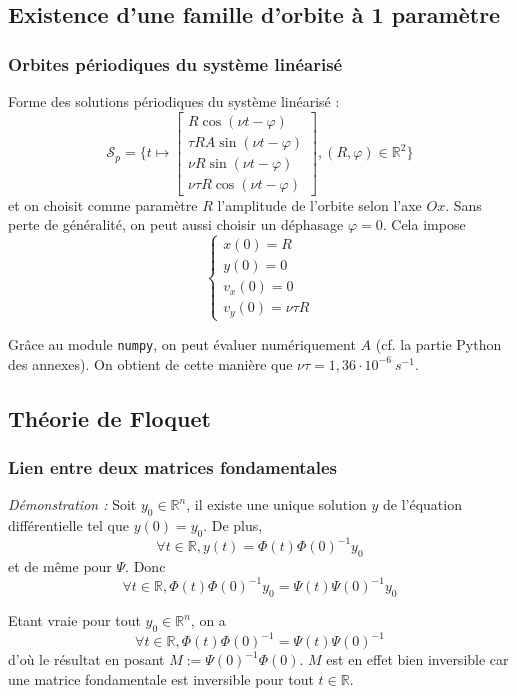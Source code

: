 \documentclass{beamer}
\begin{document}
	\subsection{Existence d'une famille d'orbite à 1 paramètre}
	\begin{frame}[fragile]
		\frametitle{Orbites périodiques du système linéarisé}{\small
		Forme des solutions périodiques du système linéarisé :
		\begin{equation*}
			\mathcal{S}_p = \{ t \mapsto
			\begin{bmatrix}
			R\cos(\nu t - \varphi) \\ \tau RA\sin(\nu t - \varphi) \\ \nu R \sin(\nu t - \varphi) \\ \nu\tau R \cos(\nu t - \varphi)
			\end{bmatrix}, (R,\varphi) \in \mathbb{R}^2
			\}
		\end{equation*}
		et on choisit comme paramètre $R$ l'amplitude de l'orbite selon l'axe $Ox$. Sans perte de généralité, on peut aussi choisir un déphasage $\varphi = 0$. Cela impose
		\begin{equation*}
			\begin{cases}
				x(0) = R \\ y(0) = 0 \\ v_x(0) = 0 \\ v_y(0) = \nu\tau R
			\end{cases}
		\end{equation*}
		
		Grâce au module \verb|numpy|, on peut évaluer numériquement $A$ (cf. la partie Python des annexes). On obtient de cette manière que $\nu\tau = 1,36\cdot 10^{-6} \: s^{-1}$.
		}
	\end{frame}
	

	\subsection{Théorie de Floquet}
	\begin{frame}
		\frametitle{Lien entre deux matrices fondamentales}
		
		{\small
		\textit{Démonstration :}
		Soit $y_0 \in \mathbb{R}^n$, il existe une unique solution $y$ de l'équation différentielle tel que $y(0) = y_0$. De plus,
		\begin{equation*}
			\forall t \in \mathbb{R}, y(t) = \Phi(t)\Phi(0)^{-1}y_0
		\end{equation*}
		et de même pour $\Psi$. Donc
		\begin{equation*}
			\forall t \in \mathbb{R}, \Phi(t)\Phi(0)^{-1}y_0 = \Psi(t)\Psi(0)^{-1}y_0
		\end{equation*}
		
		Etant vraie pour tout $y_0 \in \mathbb{R}^n$, on a
		\begin{equation*}
			\forall t \in \mathbb{R}, \Phi(t)\Phi(0)^{-1} = \Psi(t)\Psi(0)^{-1}
		\end{equation*}
		d'où le résultat en posant $M := \Psi(0)^{-1}\Phi(0)$. $M$ est en effet bien inversible car une matrice fondamentale est inversible pour tout $t \in \mathbb{R}$.
		}
	\end{frame}
	
\end{document}
